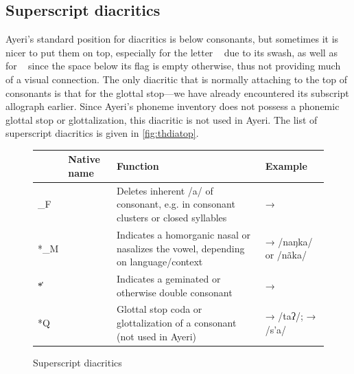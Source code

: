 \subsection{Superscript diacritics}

Ayeri's standard position for diacritics is below consonants, but sometimes it
is nicer to put them on top, especially for the letter ~ due to
its swash, as well as for ~ since the space below its flag is
empty otherwise, thus not providing much of a visual connection. The only
diacritic that is normally attaching to the top of consonants is that for the
glottal stop---we have already encountered its subscript allograph earlier.
Since Ayeri's phoneme inventory does not possess a phonemic glottal stop or
glottalization, this diacritic is not used in Ayeri. The list of superscript
diacritics is given in \autoref{fig:thdiatop}.

\begin{figure}[tp]
\caption{Superscript diacritics}
\begin{tabu} to 
\toprule
\tableheaderfont

	& Native name
	& Function
	& Example
	\\
	
\toprule

*\_F
	& 
	& Deletes inherent /a/ of consonant, e.g. in consonant clusters or 
		closed syllables
	&  → 
	\\
	
\midrule

*\_M
	& 
	& Indicates a homorganic nasal or nasalizes the vowel, depending on 
		language/context
	&  →  /naŋka/ or /nãka/
	\\
	
\midrule

*̔
	& 
	& Indicates a geminated or otherwise double consonant
	&  → 
	\\
	
\midrule

*Q
	& 
	& Glottal stop coda or glottalization of a consonant (not used in Ayeri)
	&  →  /taʔ/;\newline
		 →  /s’a/
	\\

\bottomrule
\end{tabu}
\label{fig:thdiatop}
\end{figure}

